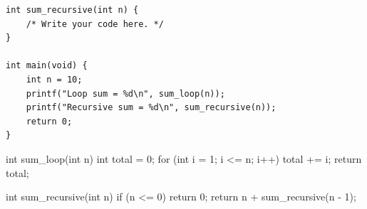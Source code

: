 \documentclass[12pt,a4paper,answers,addpoints]{exam}
\begin{document}
\begin{questions}
\begin{lstlisting}[style=examc]
int sum_recursive(int n) {
    /* Write your code here. */
}

int main(void) {
    int n = 10;
    printf("Loop sum = %d\n", sum_loop(n));
    printf("Recursive sum = %d\n", sum_recursive(n));
    return 0;
}
\end{lstlisting}
\shownoanswers{\vspace{8cm}}
\begin{CcodeSol}
int sum_loop(int n) {
    int total = 0;
    for (int i = 1; i <= n; i++)
        total += i;
    return total;
}

int sum_recursive(int n) {
    if (n <= 0)
        return 0;
    return n + sum_recursive(n - 1);
}
\end{CcodeSol}

\end{questions}

\vfill
\noindent{}
\end{document}
